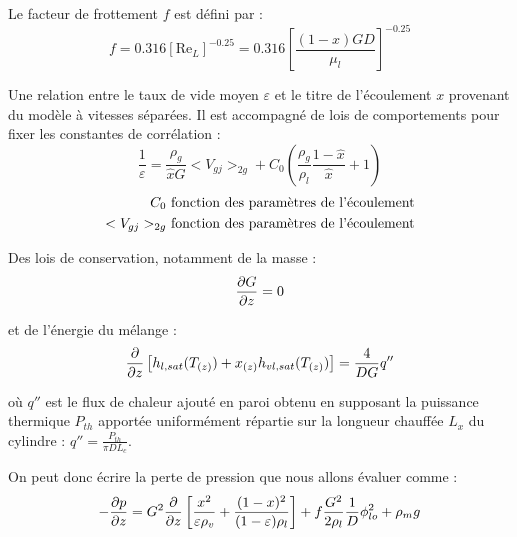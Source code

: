 Le facteur de frottement $f$ est défini par :
\begin{equation}
    f = 0.316 \left[\text{Re}_L\right]^{-0.25} = 0.316 \left[\frac{(1-x)G D}{\mu_l}\right]^{-0.25} 
\end{equation}

Une relation entre le taux de vide moyen $\varepsilon$ et le titre de l'écoulement $x$ provenant du modèle à vitesses séparées. Il est accompagné de lois de comportements pour fixer les constantes de corrélation :
\begin{equation}
        \frac{1}{\varepsilon} = \frac{\rho_g}{\hat{x} G} <V_{gj}>_{2g} + C_0\left(\frac{\rho_g}{\rho_l}\frac{1-\hat{x}}{\hat{x}} + 1\right) 
\end{equation}
\begin{align*}
         C_0 &\textnormal{ fonction des paramètres de l'écoulement}\\
        <V_{gj}>_{2g} &\textnormal{ fonction des paramètres de l'écoulement}   
\end{align*}

Des lois de conservation, notamment de la masse :
\begin{equation}
    \pder[G]{z} = 0
\end{equation}

et de l'énergie du mélange :
\begin{equation}
    \pder{z} \left[ h_{l,sat}(T_{(z)})+x_{(z)}h_{vl,sat}(T_{(z)})\right] = \frac{4}{DG}q''
\end{equation}

où $q''$ est le flux de chaleur ajouté en paroi obtenu en supposant la puissance thermique $P_{th}$ apportée uniformément répartie sur la longueur chauffée $L_x$ du cylindre : $q'' = \frac{P_{th}}{\pi DL_c}$.\\ \par
On peut donc écrire la perte de pression que nous allons évaluer comme :
\begin{equation}
     -\pder[p]{z} = G^2\pder{z}\left[\frac{x^{2}}{\varepsilon \rho_{v}}+\frac{(1-x)^{2}}{(1-\varepsilon) \rho_{l}} \right] + f\frac{G^2}{2 \rho_l}\frac{1}{D} \phi_{lo}^2 + \rho_m g
\end{equation}
